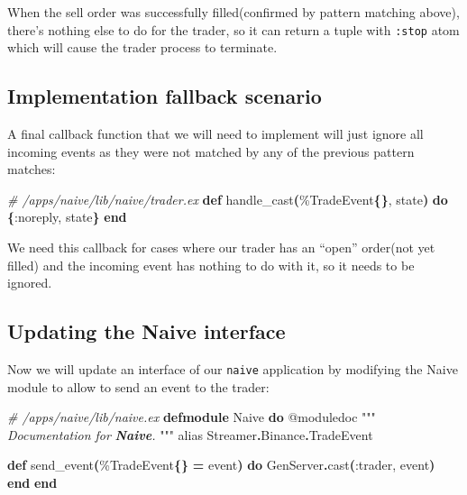 \documentclass[
  oneside]{book}
\newenvironment{Shaded}{\begin{snugshade}}{\end{snugshade}}
\newcommand{\CommentTok}[1]{\textcolor[rgb]{0.56,0.35,0.01}{\textit{#1}}}
\newcommand{\ConstantTok}[1]{\textcolor[rgb]{0.56,0.35,0.01}{#1}}
\newcommand{\FunctionTok}[1]{\textcolor[rgb]{0.13,0.29,0.53}{\textbf{#1}}}
\newcommand{\ImportTok}[1]{#1}
\newcommand{\InformationTok}[1]{\textcolor[rgb]{0.56,0.35,0.01}{\textbf{\textit{#1}}}}
\newcommand{\KeywordTok}[1]{\textcolor[rgb]{0.13,0.29,0.53}{\textbf{#1}}}
\newcommand{\NormalTok}[1]{#1}
\newcommand{\OperatorTok}[1]{\textcolor[rgb]{0.81,0.36,0.00}{\textbf{#1}}}
\newcommand{\OtherTok}[1]{\textcolor[rgb]{0.56,0.35,0.01}{#1}}
\newcommand{\VariableTok}[1]{\textcolor[rgb]{0.00,0.00,0.00}{#1}}
\begin{document}
When the sell order was successfully filled(confirmed by pattern matching above), there's nothing else to do for the trader, so it can return a tuple with \texttt{:stop} atom which will cause the trader process to terminate.

\subsection{Implementation fallback scenario}\label{implementation-fallback-scenario}

A final callback function that we will need to implement will just ignore all
incoming events as they were not matched by any of the previous pattern matches:

\begin{Shaded}
\begin{Highlighting}[]
  \CommentTok{\# /apps/naive/lib/naive/trader.ex}
  \KeywordTok{def}\NormalTok{ handle\_cast}\FunctionTok{(}\NormalTok{\%}\ConstantTok{TradeEvent}\FunctionTok{\{\}}\NormalTok{, state}\FunctionTok{)} \KeywordTok{do}
    \FunctionTok{\{}\VariableTok{:noreply}\NormalTok{, state}\FunctionTok{\}}
  \KeywordTok{end}
\end{Highlighting}
\end{Shaded}

We need this callback for cases where our trader has an ``open'' order(not yet filled) and the incoming event has nothing to do with it, so it needs to be ignored.

\subsection{Updating the Naive interface}\label{updating-the-naive-interface}

Now we will update an interface of our \texttt{naive} application by modifying the Naive module to allow to send an event to the trader:

\begin{Shaded}
\begin{Highlighting}[]
\CommentTok{\# /apps/naive/lib/naive.ex}
\KeywordTok{defmodule} \ConstantTok{Naive} \KeywordTok{do}
  \OtherTok{@moduledoc """}
\CommentTok{  Documentation for }\InformationTok{\textasciigrave{}Naive\textasciigrave{}}\CommentTok{.}
\CommentTok{  }\OtherTok{"""}
  \ImportTok{alias} \ConstantTok{Streamer}\OperatorTok{.}\ConstantTok{Binance}\OperatorTok{.}\ConstantTok{TradeEvent}

  \KeywordTok{def}\NormalTok{ send\_event}\FunctionTok{(}\NormalTok{\%}\ConstantTok{TradeEvent}\FunctionTok{\{\}} \OperatorTok{=}\NormalTok{ event}\FunctionTok{)} \KeywordTok{do}
    \ConstantTok{GenServer}\OperatorTok{.}\NormalTok{cast}\FunctionTok{(}\VariableTok{:trader}\NormalTok{, event}\FunctionTok{)}
  \KeywordTok{end}
\KeywordTok{end}
\end{Highlighting}
\end{Shaded}
\end{document}

